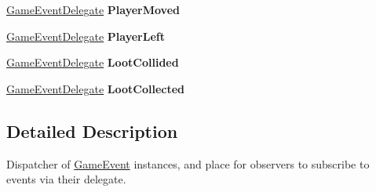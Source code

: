 \begin{DoxyCompactItemize}
\item 
\hypertarget{class_skyrates_1_1_client_1_1_game_1_1_event_1_1_game_events_a347e7a35ad1bbb862f1a4028c2e375ef}{\hyperlink{namespace_skyrates_1_1_client_1_1_game_1_1_event_a448e5d409dc993bd700f2f7f8161adf7}{Game\-Event\-Delegate} {\bfseries Player\-Moved}}\label{class_skyrates_1_1_client_1_1_game_1_1_event_1_1_game_events_a347e7a35ad1bbb862f1a4028c2e375ef}

\item 
\hypertarget{class_skyrates_1_1_client_1_1_game_1_1_event_1_1_game_events_a5dc1bfc1852ff08c98f6c521b96b1b07}{\hyperlink{namespace_skyrates_1_1_client_1_1_game_1_1_event_a448e5d409dc993bd700f2f7f8161adf7}{Game\-Event\-Delegate} {\bfseries Player\-Left}}\label{class_skyrates_1_1_client_1_1_game_1_1_event_1_1_game_events_a5dc1bfc1852ff08c98f6c521b96b1b07}

\item 
\hypertarget{class_skyrates_1_1_client_1_1_game_1_1_event_1_1_game_events_a2fab9c767804b6cc3c12d816708a244d}{\hyperlink{namespace_skyrates_1_1_client_1_1_game_1_1_event_a448e5d409dc993bd700f2f7f8161adf7}{Game\-Event\-Delegate} {\bfseries Loot\-Collided}}\label{class_skyrates_1_1_client_1_1_game_1_1_event_1_1_game_events_a2fab9c767804b6cc3c12d816708a244d}

\item 
\hypertarget{class_skyrates_1_1_client_1_1_game_1_1_event_1_1_game_events_a9cae2ea48c6b7fe77f44ba7c49255ef6}{\hyperlink{namespace_skyrates_1_1_client_1_1_game_1_1_event_a448e5d409dc993bd700f2f7f8161adf7}{Game\-Event\-Delegate} {\bfseries Loot\-Collected}}\label{class_skyrates_1_1_client_1_1_game_1_1_event_1_1_game_events_a9cae2ea48c6b7fe77f44ba7c49255ef6}

\end{DoxyCompactItemize}


\subsection{Detailed Description}
Dispatcher of \hyperlink{class_skyrates_1_1_client_1_1_game_1_1_event_1_1_game_event}{Game\-Event} instances, and place for observers to subscribe to events via their delegate. 



